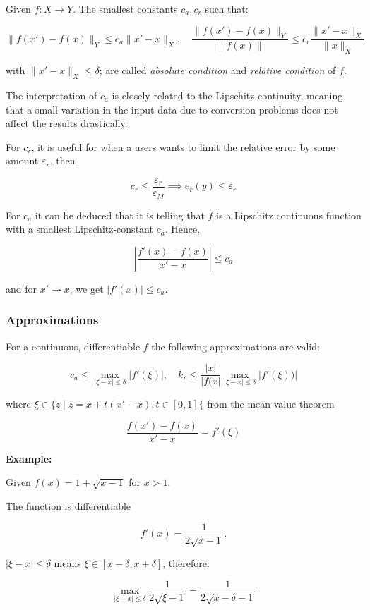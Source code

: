 Given \(f: X \to Y\). The smallest constants \(c_a, c_r\) such that: 

\[
    \|f(x') - f(x) \|_Y \le c_a \|x' - x\|_X, \quad  
    \frac{\|f(x') - f(x) \|_Y}{\|f(x)\|} \le c_r \frac{\|x' - x\|_X}{\|x\|_X}
\]

with \(\|x' - x\|_X \le \delta\); are called \emph{absolute condition} and \emph{relative condition} of \(f\).

The interpretation of \(c_a\) is closely related to the Lipschitz continuity, meaning that a small variation in the 
input data due to conversion problems does not affect the results drastically.

For \(c_r\), it is useful for when a users wants to limit the relative error by some amount \(\varepsilon_r\), then

\[
    c_r \le \frac{\varepsilon_r}{\varepsilon_M} \implies e_r (y) \le \varepsilon_r
\]

For \(c_a\) it can be deduced that it is telling that \(f\) is a Lipschitz continuous function with a smallest 
Lipschitz-constant \(c_a\). Hence, 

\[
    \left|\frac{f'(x) - f(x)}{x' - x}\right| \le c_a
\]

and for \(x' \to x\), we get \(|f'(x)| \le c_a\).

\subsubsection{Approximations}

For a continuous, differentiable \(f\) the following approximations are valid: 

\[
    c_a \le \max_{|\xi - x| \le \delta} |f'(\xi)|, \quad k_r \le \frac{|x|}{|f(x|} \max_{|\xi - x| \le \delta} |f'(\xi))|
\]

where \(\xi \in \{z \mid z = x + t(x' - x), t \in [0, 1]\{\) from the mean value theorem 

\[
    \frac{f(x') - f(x)}{x' - x} = f'(\xi)
\]

\textbf{Example:}

Given \(f(x) = 1 + \sqrt{x - 1}\) for \(x > 1\).

The function is differentiable 

\[
    f'(x) = \frac{1}{2\sqrt{x - 1}}.
\]

\(|\xi - x| \le \delta\) means \(\xi \in [x - \delta, x + \delta]\), therefore: 

\[
    \max_{|\xi - x| \le \delta} \frac{1}{2\sqrt{\xi - 1}} = \frac{1}{2\sqrt{x - \delta - 1}}
\]

